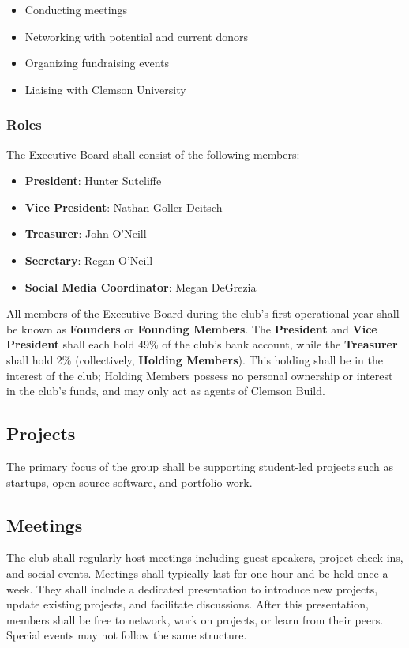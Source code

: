 \documentclass{article}
\begin{document}
\begin{itemize}
\item Conducting meetings
\item Networking with potential and current donors
\item Organizing fundraising events
\item Liaising with Clemson University
\end{itemize}

\subsubsection{Roles}
The Executive Board shall consist of the following members:

\begin{itemize}
    \item \textbf{President}: Hunter Sutcliffe
    \item \textbf{Vice President}: Nathan Goller-Deitsch
    \item \textbf{Treasurer}: John O'Neill
    \item \textbf{Secretary}: Regan O'Neill
    \item \textbf{Social Media Coordinator}: Megan DeGrezia
\end{itemize}

All members of the Executive Board during the club's first operational year shall be known as \textbf{Founders} or \textbf{Founding Members}. The \textbf{President} and \textbf{Vice President} shall each hold 49\% of the club's bank account, while the \textbf{Treasurer} shall hold 2\% (collectively, \textbf{Holding Members}). This holding shall be in the interest of the club; Holding Members possess no personal ownership or interest in the club's funds, and may only act as agents of Clemson Build.

\subsection{Projects}
The primary focus of the group shall be supporting student-led projects such as startups, open-source software, and portfolio work. 

\subsection{Meetings}
The club shall regularly host meetings including guest speakers, project check-ins, and social events. Meetings shall typically last for one hour and be held once a week. They shall include a dedicated presentation to introduce new projects, update existing projects, and facilitate discussions. After this presentation, members shall be free to network, work on projects, or learn from their peers. Special events may not follow the same structure. 
\end{document}
